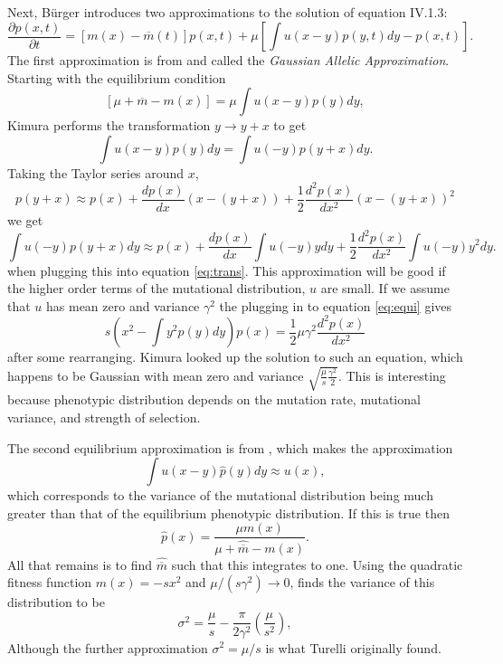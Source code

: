 Next, B{\"u}rger introduces two approximations to the solution of equation IV.1.3:
\begin{equation} \label{eq:1.3}
  \frac{\partial p(x,t)}{\partial t} = \left[ m(x) -
    \overline{m}(t) \right]p(x,t) + \mu \left[ \int u(x-y)p(y,t)dy -p(x,t)\right].
\end{equation}
The first approximation is from \citet{Kimura1965} and called the \emph{Gaussian Allelic Approximation}. Starting with
the equilibrium condition
\begin{equation} \label{eq:equi}
\left[ \mu + \overline{m} - m(x) \right] = \mu \int u(x-y) p(y)dy, 
\end{equation}
Kimura performs the transformation $y \to y + x$ to get
\begin{equation} \label{eq:trans}
\int u(x-y) p(y) dy = \int u(-y)p(y+x)dy.
\end{equation}
Taking the Taylor series around $x$, 
\begin{equation}
p(y+x) \approx p(x) + \frac{dp(x)}{dx}\left( x-(y+x) \right) + \frac{1}{2} \frac{d^2p(x)}{dx^2}\left( x-(y+x) \right)^2
\end{equation}
we get
\begin{equation}
\int u(-y)p(y+x)dy \approx p(x) + \frac{dp(x)}{dx} \int u(-y)y dy + \frac{1}{2} \frac{d^2p(x)}{dx^2}\int u(-y)y^2dy.
\end{equation}
when plugging this into equation \ref{eq:trans}. This approximation will be good if the higher order terms of the
mutational distribution, $u$ are small. If we assume that $u$ has mean zero and variance $\gamma^2$ the plugging in to 
equation \ref{eq:equi} gives
\begin{equation}
s\left( x^2 - \int y^2p(y)dy\right)p(x) = \frac{1}{2}\mu\gamma^2\frac{d^2p(x)}{dx^2}
\end{equation}
after some rearranging. Kimura looked up the solution to such an equation, which happens to be Gaussian with mean zero
and variance $\sqrt{\frac{\mu}{s}\frac{\gamma^2}{2}}$. This is interesting because phenotypic distribution depends on
the mutation rate, mutational variance, and strength of selection.

The second equilibrium approximation is from \citet{Turelli1984}, which makes the approximation 
\begin{equation}
\int u(x-y)\hat{p}(y)dy \approx u(x), 
\end{equation}
which corresponds to the variance of the mutational distribution being much greater than that of the equilibrium
phenotypic distribution. If this is true then 
\begin{equation}
\hat{p}(x) = \frac{\mu m(x)}{\mu + \hat{\overline{m}} - m(x)}.
\end{equation}
All that remains is to find $\hat{\overline{m}}$ such that this integrates to one. Using the quadratic fitness function
$m(x)=-sx^2$ and $\mu/(s\gamma^2) \to 0$, \citet{burger2000mathematical} finds the variance of this distribution to be
\begin{equation}
\sigma^2 = \frac{\mu}{s} - \frac{\pi}{2\gamma^2}\left( \frac{\mu}{s^2}\right), 
\end{equation}
Although the further approximation $\sigma^2=\mu/s$ is what Turelli originally found.


